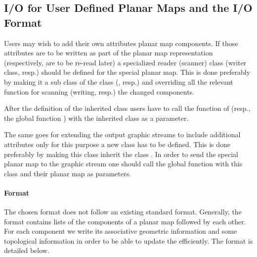 \begin{ccAdvanced}
\subsection*{I/O for User Defined Planar Maps and the I/O Format}

Users may wish to add their own attributes planar map components. If
those attributes are to be written as part of the planar map
representation (respectively, are to be re-read later) a specialized
reader (scanner) class (writer class, resp.) should be defined for the special
planar map. This is done preferably by making it a sub class of the class
 (, resp.) and
overriding all the relevant function for scanning (writing, resp.) the
changed components.

After the definition of the inherited class users have to call the function 
 of  (resp., the global function  ) with the inherited class as a parameter.

The same goes for extending the output graphic streams to include
additional attributes only for this purpose a new \/ class
has to be defined.  This is done preferably by making this class
inherit the class
. In order to send the special planar map to the graphic stream one should call the global function  
with this class and their planar map as parameters.

\paragraph{Format}
The chosen format does not follow an existing standard format.
Generally, the format contains lists of the components of a planar map
followed by each other. For each component we write its associative
geometric information and some topological information in order to be
able to update the  efficiently. The format is detailed
below.


\end{ccAdvanced}

